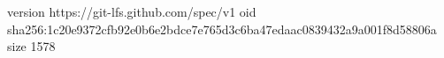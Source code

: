version https://git-lfs.github.com/spec/v1
oid sha256:1c20e9372cfb92e0b6e2bdce7e765d3c6ba47edaac0839432a9a001f8d58806a
size 1578
